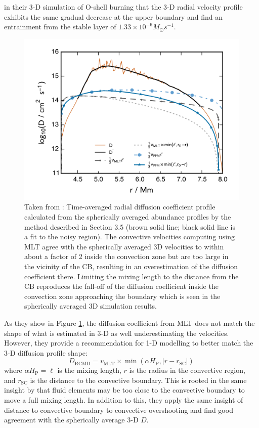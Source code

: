 \cite{jonesIdealizedHydrodynamicSimulations2017} in their 3-D simulation of O-shell burning that the 3-D radial velocity profile exhibits the same gradual decrease at the upper boundary and find an entrainment from the stable layer of $1.33\times10^{-6}M_\odot s^{-1}$.
\begin{figure}[!htbp]
\includegraphics[width=\textwidth]{chapters/1/figures/Jones+17_Fig21.png}
\caption{Taken from \cite{jonesIdealizedHydrodynamicSimulations2017}: Time-averaged radial diffusion coefficient profile calculated from the spherically averaged abundance profiles by the method described in Section 3.5 (brown solid line; black solid line is a fit to the noisy region). The convective velocities computing using MLT agree with the spherically averaged 3D velocities to within about a factor of 2 inside the convection zone but are too large in the vicinity of the CB, resulting in an overestimation of the diffusion coefficient there. Limiting the mixing length to the distance from the CB reproduces the fall-off of the diffusion coefficient inside the convection zone approaching the boundary which is seen in the spherically averaged 3D simulation results.
\label{fig:Jones17_Fig21}}
\end{figure}
As they show in Figure \ref{fig:Jones17_Fig21}, the diffusion coefficient from MLT does not match the shape of what is estimated in 3-D as well underestimating the velocities.
However, they provide a recommendation for 1-D modelling to better match the 3-D diffusion profile shape:
\begin{equation}
    D_{\mathrm{RCMD}} = v_{\mathrm{MLT}}\times\min(\alpha H_\mathrm{P},|r-r_{\mathrm{SC}}|)
\end{equation}
where $\alpha H_\mathrm{{P}}=\ell$ is the mixing length, $r$ is the radius in the convective region, and $r_{\mathrm{SC}}$ is the distance to the convective boundary.
This is rooted in the same insight by \cite{meakinTurbulentConvectionStellar2007} that fluid elements may be too close to the convective boundary to move a full mixing length.
In addition to this, they apply the same insight of distance to convective boundary to convective overshooting and find good agreement with the spherically average 3-D $D$.

